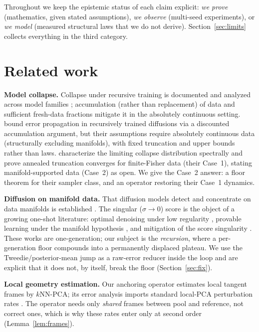 \documentclass[11pt]{article}
\theoremstyle{remark}
\begin{document}
Throughout we keep the epistemic status of each claim explicit: \emph{we prove}
(mathematics, given stated assumptions), \emph{we observe} (multi-seed experiments), or
\emph{we model} (measured structural laws that we do not derive). Section~\ref{sec:limits}
collects everything in the third category.

\section{Related work}\label{sec:related}

\textbf{Model collapse.} Collapse under recursive training is documented and analyzed
across model families
\citep{shumailov2024nature,alemohammad2024mad,dohmatob2024tale,bertrand2024stability,gerstgrasser2024collapse};
accumulation (rather than replacement) of data and sufficient fresh-data fractions
mitigate it in the absolutely continuous setting. \citet{khelifa2026quantifying} bound
error propagation in recursively trained diffusions via a discounted accumulation
argument, but their assumptions require absolutely continuous data (structurally
excluding manifolds), with fixed truncation and upper bounds rather than laws.
\citet{khelifa2026recursive} characterize the limiting collapse distribution spectrally
and prove annealed truncation converges for finite-Fisher data (their Case~1), stating
manifold-supported data (Case~2) as open. We give the Case~2 answer: a floor theorem for
their sampler class, and an operator restoring their Case~1 dynamics.

\textbf{Diffusion on manifold data.} That diffusion models detect and concentrate on
data manifolds is established \citep{pidstrigach2022manifold,debortoli2022convergence}.
The singular ($\sigma\to0$) score is the object of a growing one-shot literature: optimal
denoising under low regularity \citep{beyler2025optimal}, provable learning under the
manifold hypothesis \citep{huang2026provable}, and mitigation of the score singularity
\citep{liu2025euclidean}. These works are one-generation; our subject is the
\emph{recursion}, where a per-generation floor compounds into a permanently displaced
plateau. We use the Tweedie/posterior-mean jump \citep{efron2011tweedie,beyler2025optimal}
as a raw-error reducer inside the loop and are explicit that it does not, by itself,
break the floor (Section~\ref{sec:fix}).

\textbf{Local geometry estimation.} Our anchoring operator estimates local tangent
frames by $k$NN-PCA; its error analysis imports standard local-PCA perturbation rates
\citep{aamari2019nonasymptotic,singer2012vector}. The operator needs only \emph{shared}
frames between pool and reference, not correct ones, which is why these rates enter
only at second order (Lemma~\ref{lem:frames}).
\end{document}
